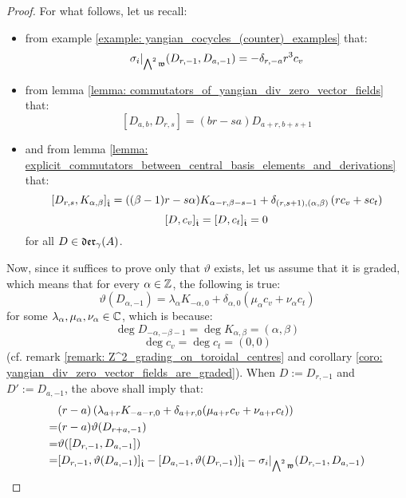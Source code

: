 \begin{proof}
                For what follows, let us recall:
                \begin{itemize}
                    \item from example \ref{example: yangian_cocycles_(counter)_examples} that:
                        $$\sigma_i|_{ \bigwedge^2 \frakw }(D_{r, -1}, D_{a, -1}) = -\delta_{r, -a} r^3 c_v$$
                    \item from lemma \ref{lemma: commutators_of_yangian_div_zero_vector_fields} that:
                        $$[D_{a, b}, D_{r, s}] = (br - sa) D_{a + r, b + s + 1}$$
                    \item and from lemma \ref{lemma: explicit_commutators_between_central_basis_elements_and_derivations} that:
                        $$[D_{r, s}, K_{\alpha, \beta}]_{\extendedtoroidal} = ((\beta - 1)r - s\alpha) K_{\alpha - r, \beta - s - 1} + \delta_{(r, s + 1), (\alpha, \beta)} \left( r c_v + s c_t \right)$$
                        $$[D, c_v]_{\extendedtoroidal} = [D, c_t]_{\extendedtoroidal} = 0$$
                    for all $D \in \divzero$.
                \end{itemize}
                Now, since it suffices to prove only that $\vartheta$ exists, let us assume that it is graded, which means that for every $\alpha \in \Z$, the following is true:
                    $$\vartheta(D_{\alpha, -1}) = \lambda_{\alpha} K_{-\alpha, 0} + \delta_{\alpha, 0}( \mu_{\alpha} c_v + \nu_{\alpha} c_t )$$
                for some $\lambda_{\alpha}, \mu_{\alpha}, \nu_{\alpha} \in \bbC$, which is because:
                    $$\deg D_{-\alpha, -\beta - 1} = \deg K_{\alpha, \beta} = (\alpha, \beta)$$
                    $$\deg c_v = \deg c_t = (0, 0)$$
                (cf. remark \ref{remark: Z^2_grading_on_toroidal_centres} and corollary \ref{coro: yangian_div_zero_vector_fields_are_graded}). When $D := D_{r, -1}$ and $D' := D_{a, -1}$, the above shall imply that:
                    $$
                        \begin{aligned}
                            & (r - a) \left( \lambda_{a + r} K_{-a - r, 0} + \delta_{a + r, 0}( \mu_{a + r} c_v + \nu_{a + r} c_t ) \right)
                            \\
                            = & (r - a) \vartheta( D_{r + a, -1} )
                            \\
                            = & \vartheta( [D_{r, -1}, D_{a, -1}] )
                            \\
                            = & [ D_{r, -1}, \vartheta(D_{a, -1}) ]_{\extendedtoroidal} - [ D_{a, -1}, \vartheta(D_{r, -1}) ]_{\extendedtoroidal} - \sigma_i|_{\bigwedge^2 \frakw}(D_{r, -1}, D_{a, -1})

\end{aligned}$$
\end{proof}
